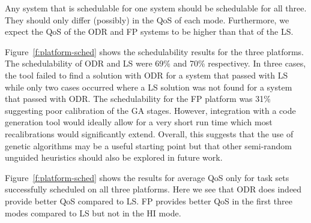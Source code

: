 	Any system that is schedulable for one system should be schedulable for all three. 
	They should only differ (possibly) in the QoS of each mode. 
	Furthermore, we expect the QoS of the ODR and FP systems to be higher than that of the LS.  

	Figure~\ref{f:platform-sched} shows the schedulability results for the three platforms. 
	The schedulability of ODR and LS were 69\% and 70\% respectivey. 
	In three cases, the tool failed to find a solution with ODR for a system that passed with LS while only two cases occurred where a LS solution was not found for a system that passed with ODR. 
	The schedulability for the FP platform was 31\% suggesting poor calibration of the GA stages. However, integration with a code generation tool would ideally allow for a very short run time which most recalibrations would significantly extend. 
	Overall, this suggests that the use of genetic algorithms may be a useful starting point but that other semi-random unguided heuristics should also be explored in future work.
	
	Figure~\ref{f:platform-sched} shows the results for average QoS only for task sets successfully scheduled on all three platforms. 
	Here we see that ODR does indeed provide better QoS compared to LS.
	FP provides better QoS in the first three modes compared to LS but not in the HI mode.
	

